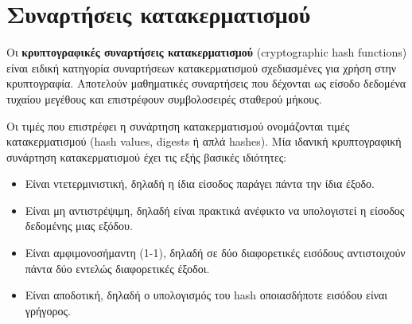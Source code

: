 \section{Συναρτήσεις κατακερματισμού}

Οι \textbf{κρυπτογραφικές συναρτήσεις κατακερματισμού} (cryptographic hash functions) είναι ειδική κατηγορία συναρτήσεων κατακερματισμού σχεδιασμένες για χρήση στην κρυπτογραφία. Αποτελούν μαθηματικές συναρτήσεις που δέχονται ως είσοδο δεδομένα τυχαίου μεγέθους και επιστρέφουν συμβολοσειρές σταθερού μήκους.


Οι τιμές που επιστρέφει η συνάρτηση κατακερματισμού ονομάζονται τιμές κατακερματισμού (hash values, digests ή απλά hashes). Μία ιδανική κρυπτογραφική συνάρτηση κατακερματισμού έχει τις εξής βασικές ιδιότητες:

\begin{itemize}
	\item Είναι ντετερμινιστική, δηλαδή η ίδια είσοδος παράγει πάντα την ίδια έξοδο.
	\item Είναι μη αντιστρέψιμη, δηλαδή είναι πρακτικά ανέφικτο να υπολογιστεί η είσοδος δεδομένης μιας εξόδου.
	\item Είναι αμφιμονοσήμαντη (1-1), δηλαδή σε δύο διαφορετικές εισόδους αντιστοιχούν πάντα δύο εντελώς διαφορετικές έξοδοι.
	\item Είναι αποδοτική, δηλαδή ο υπολογισμός του hash οποιασδήποτε εισόδου είναι γρήγορος.
\end{itemize}

